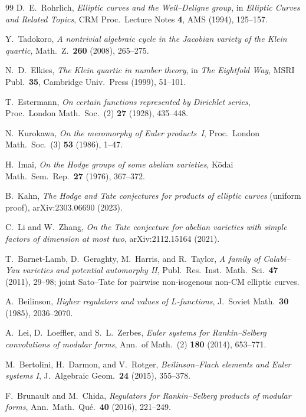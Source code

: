 \documentclass[11pt]{article}
\theoremstyle{definition}
\theoremstyle{remark}
\begin{document}
\begin{thebibliography}{99}
 D.~E.~Rohrlich, \emph{Elliptic curves and the Weil--Deligne
group}, in \emph{Elliptic Curves and Related Topics}, CRM Proc.\ Lecture
Notes \textbf{4}, AMS (1994), 125--157.

 Y.~Tadokoro, \emph{A nontrivial algebraic cycle in the
Jacobian variety of the Klein quartic}, Math.\ Z.\ \textbf{260} (2008),
265--275.

 N.~D.~Elkies, \emph{The Klein quartic in number theory}, in
\emph{The Eightfold Way}, MSRI Publ.\ \textbf{35}, Cambridge Univ.\ Press
(1999), 51--101.

 T.~Estermann, \emph{On certain functions represented by
Dirichlet series}, Proc.\ London Math.\ Soc.\ (2) \textbf{27} (1928),
435--448.

 N.~Kurokawa, \emph{On the meromorphy of Euler products~I},
Proc.\ London Math.\ Soc.\ (3) \textbf{53} (1986), 1--47.

 H.~Imai, \emph{On the Hodge groups of some abelian
varieties}, K\=odai Math.\ Sem.\ Rep.\ \textbf{27} (1976), 367--372.

 B.~Kahn, \emph{The Hodge and Tate conjectures for
products of elliptic curves} (uniform proof), arXiv:2303.06690 (2023).

 C.~Li and W.~Zhang, \emph{On the Tate conjecture for
abelian varieties with simple factors of dimension at most two},
arXiv:2112.15164 (2021).

 T.~Barnet-Lamb, D.~Geraghty, M.~Harris, and R.~Taylor,
\emph{A family of Calabi--Yau varieties and potential automorphy II},
Publ.\ Res.\ Inst.\ Math.\ Sci.\ \textbf{47} (2011), 29--98; joint
Sato--Tate for pairwise non-isogenous non-CM elliptic curves.

 A.~Beilinson, \emph{Higher regulators and values of
$L$-functions}, J.\ Soviet Math.\ \textbf{30} (1985), 2036--2070.

 A.~Lei, D.~Loeffler, and S.~L.~Zerbes, \emph{Euler systems for
Rankin--Selberg convolutions of modular forms}, Ann.\ of Math.\ (2)
\textbf{180} (2014), 653--771.

 M.~Bertolini, H.~Darmon, and V.~Rotger, \emph{Beilinson--Flach
elements and Euler systems I}, J.\ Algebraic Geom.\ \textbf{24} (2015),
355--378.

 F.~Brunault and M.~Chida, \emph{Regulators for
Rankin--Selberg products of modular forms}, Ann.\ Math.\ Qu\'e.\ \textbf{40}
(2016), 221--249.


\end{thebibliography}
\end{document}
